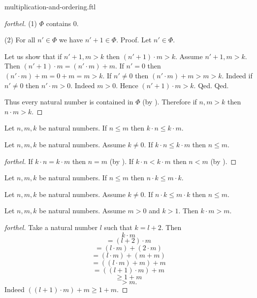 \documentclass{naproche-library}
\begin{document}
\begin{smodule}[title=Multiplication and Ordering]{multiplication-and-ordering.ftl}
\begin{proof}[forthel]
  (1) $\Phi$ contains $0$.

  (2) For all $n' \in \Phi$ we have $n' + 1 \in \Phi$. \newline
  Proof.
    Let $n' \in \Phi$.

    Let us show that if $n' + 1, m > k$ then $(n' + 1) \cdot m > k$.
      Assume $n' + 1, m > k$.
      Then $(n' + 1) \cdot m = (n' \cdot m) + m$.
      If $n' = 0$ then
      $(n' \cdot m) + m
        = 0 + m
        = m
        > k$.
      If $n' \neq 0$ then
      $(n' \cdot m) + m
        > m
        > k$.
      Indeed if $n' \neq 0$ then $n' \cdot m > 0$.
      Indeed $m > 0$.
      Hence $(n' + 1) \cdot m > k$.
    Qed.
  Qed.

  Thus every natural number is contained in $\Phi$ (by ).
  Therefore if $n, m > k$ then $n \cdot m > k$.
\end{proof}

\begin{corollary}[forthel,id=ARITHMETIC_06_1751605544222720]
  Let $n, m, k$ be natural numbers.
  If $n \leq m$ then $k \cdot n \leq k \cdot m$.
\end{corollary}

\begin{corollary}[forthel,id=ARITHMETIC_06_3965209318260736]
  Let $n, m, k$ be natural numbers.
  Assume $k \neq 0$.
  If $k \cdot n \leq k \cdot m$ then $n \leq m$.
\end{corollary}
\begin{proof}[forthel]
  If $k \cdot n = k \cdot m$ then $n = m$ (by ).
  If $k \cdot n < k \cdot m$ then $n < m$ (by ).
\end{proof}

\begin{corollary}[forthel,id=ARITHMETIC_06_8946886668976128]
  Let $n, m, k$ be natural numbers.
  If $n \leq m$ then $n \cdot k \leq m \cdot k$.
\end{corollary}

\begin{corollary}[forthel,id=ARITHMETIC_06_4374428949413888]
  Let $n, m, k$ be natural numbers.
  Assume $k \neq 0$.
  If $n \cdot k \leq m \cdot k$ then $n \leq m$.
\end{corollary}

\begin{proposition}[forthel,id=ARITHMETIC_06_8813409145454592]
  Let $n, m, k$ be natural numbers.
  Assume $m > 0$ and $k > 1$.
  Then $k \cdot m > m$.
\end{proposition}
\begin{proof}[forthel]
  Take a natural number $l$ such that $k = l + 2$.
  Then
  \[  k \cdot m                       \]
  \[    = (l + 2) \cdot m             \]
  \[    = (l \cdot m) + (2 \cdot m)   \]
  \[    = (l \cdot m) + (m + m)       \]
  \[    = ((l \cdot m) + m) + m       \]
  \[    = ((l + 1) \cdot m) + m       \]
  \[    \geq 1 + m                    \]
  \[    > m.                          \]
  Indeed $((l + 1) \cdot m) + m \geq 1 + m$.
\end{proof}
\end{smodule}
\end{document}
